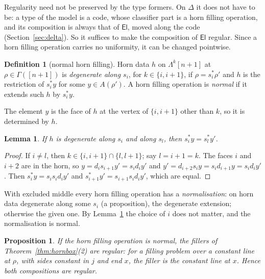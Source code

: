 \documentclass[11pt]{article}
\newcommand{\El}{\mathsf{El}}
\newcommand{\Lam}{\Lambda}
\theoremstyle{plain}
\newtheorem{lemma}[theorem]{Lemma}
\newtheorem{proposition}[theorem]{Proposition}
\theoremstyle{definition}
\newtheorem{definition}[theorem]{Definition}
\theoremstyle{remark}
\begin{document}
Regularity need not be preserved by the type formers. On $\Delta$ it does
not have to be: a type of the model is a code, whose classifier part is a
horn filling operation, and its composition is always that of $\El$,
moved along the code (Section~\ref{sec:delta}). So it suffices to make
the composition of $\El$ regular. Since a horn filling operation carries
no uniformity, it can be changed pointwise.

\begin{definition}[normal horn filling]
Horn data $h$ on $\Lam^k[n+1]$ at $\rho\in\Gamma([n+1])$ is
\emph{degenerate along $s_i$}, for $k\in\{i,i+1\}$, if $\rho=s_i^*\rho'$
and $h$ is the restriction of $s_i^*y$ for some $y\in A(\rho')$. A horn
filling operation is \emph{normal} if it extends such $h$ by $s_i^*y$.
\end{definition}

The element $y$ is the face of $h$ at the vertex of $\{i,i+1\}$ other
than $k$, so it is determined by $h$.

\begin{lemma}\label{lem:deg-unique}
If $h$ is degenerate along $s_i$ and along $s_l$, then
$s_i^*y=s_l^*y'$.
\end{lemma}

\begin{proof}
If $i\neq l$, then $k\in\{i,i+1\}\cap\{l,l+1\}$; say $l=i+1=k$. The faces
$i$ and $i+2$ are in the horn, so $y=d_is_{i+1}y'=s_id_iy'$ and
$y'=d_{i+2}s_iy=s_id_{i+1}y=s_id_iy'$. Then $s_i^*y=s_is_id_iy'$ and
$s_{i+1}^*y'=s_{i+1}s_id_iy'$, which are equal.
\end{proof}

With excluded middle every horn filling operation has a \emph{normalisation}:
on horn data degenerate along some $s_i$ (a proposition), the degenerate
extension; otherwise the given one. By Lemma~\ref{lem:deg-unique} the
choice of $i$ does not matter, and the normalisation is normal.

\begin{proposition}\label{prop:reg-delta}
If the horn filling operation is normal, the fillers of
Theorem~\ref{thm:hornbox}(2) are regular: for a filling problem over a
constant line at $\rho$, with sides constant in $j$ and end $x$, the
filler is the constant line at $x$. Hence both compositions are regular.
\end{proposition}
\end{document}
